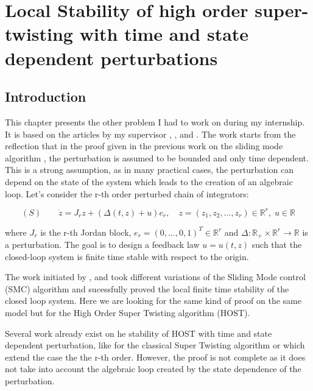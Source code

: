 

\chapter{Local Stability of high order super-twisting with time and state dependent perturbations}

\section{Introduction} 

This chapter presents the other problem I had to work on during my internship. It is based on the articles by my supervisor \cite{tietze2024local}, \cite{tietze2024localStabilisation}, and \cite{tietze2025dynamic}. The work starts from the reflection that in the proof given in the previous work on the sliding mode algorithm \cite{Moreno2012}, the perturbation is assumed to be bounded and only time dependent. This is a strong assumption, as in many practical cases, the perturbation can depend on the state of the system which leads to the creation of an algebraic loop. Let's consider the r-th order perturbed chain of integrators:

\begin{equation}
    \label{eq:perturbed_chain}
    (S) \qquad \dot{z} = J_r z + (\Delta(t,z) + u) e_r, \quad z = (z_1, z_2, \ldots, z_r) \in \mathbb{R}^r, \; u \in \mathbb{R}
\end{equation}

where $J_r$ is the r-th Jordan block, $e_r = (0, \ldots, 0, 1)^T \in \mathbb{R}^r$ and 
$\Delta: \mathbb{R}_+ \times \mathbb{R}^r \to \mathbb{R}$ is a perturbation. The goal is to design a 
feedback law $u = u(t,z)$ such that the closed-loop system is finite time stable with respect to the origin.

The work initiated by \cite{tietze2024local}, \cite{tietze2024localStabilisation} and 
\cite{tietze2025dynamic} took different variations of the Sliding Mode control (SMC) algorithm and sucessfully
proved the local finite time stability of the closed loop system. Here we are looking for the 
same kind of proof on the same model but for the High Order Super Twisting algorithm (HOST).

Several work already exist on he stability of HOST with time and state dependent perturbation, like 
\cite{Moreno2012} for the classical Super Twisting algorithm or \cite{kamal2014higher} which extend the
case the the r-th order. However, the proof is not complete as it does not take into account the
algebraic loop created by the state dependence of the perturbation.

